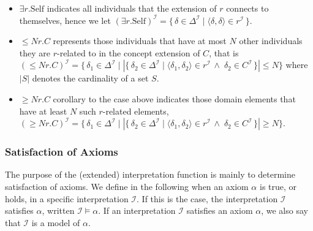 \begin{itemize}
    \item $\exists r . \mathrm{Self}$ indicates all individuals that the extension of $r$ connects to themselves, hence we let $(\exists r . \mathrm{Self})^\mathcal{I} = \{ \, \delta \in \Delta^\mathcal{I} \mid \langle \delta, \delta \rangle \in r^\mathcal{I} \, \}$.
    \item $\leq N r . C$ represents those individuals that have at most $N$ other individuals they are $r$-related to in the concept extension of $C$, that is  $(\leq N r . C)^\mathcal{I} = \{ \, \delta_1 \in \Delta^\mathcal{I} \mid \left| \{ \, \delta_2 \in \Delta^\mathcal{I} \mid \langle \delta_1, \delta_2 \rangle \in r^\mathcal{I} \, \land \; \delta_2 \in C^\mathcal{I} \, \} \right| \leq N \}$ where $|S|$ denotes the cardinality of a set $S$.
    \item $\geq N r.C$ corollary to the case above indicates those domain elements that have at least $N$ such $r$-related elements, $(\geq N r . C)^\mathcal{I} = \{ \, \delta_1 \in \Delta^\mathcal{I} \mid \left| \{ \, \delta_2 \in \Delta^\mathcal{I} \mid \langle \delta_1, \delta_2 \rangle \in r^\mathcal{I} \, \land \; \delta_2 \in C^\mathcal{I} \, \} \right| \geq N \}$.
\end{itemize}

\subsubsection{Satisfaction of Axioms}

The purpose of the (extended) interpretation function is mainly to determine satisfaction of axioms. We define in the following when an axiom $\alpha$ is true, or holds, in a specific interpretation $\mathcal{I}$. If this is the case, the interpretation $\mathcal{I}$ satisfies $\alpha$, written $\mathcal{I} \vDash \alpha$. If an interpretation $\mathcal{I}$ satisfies an axiom $\alpha$, we also say that $\mathcal{I}$ is a model of $\alpha$.

